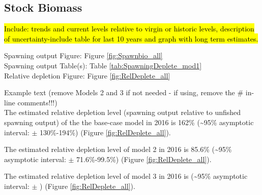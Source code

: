 \documentclass[12pt,]{article}
\begin{document}
\FloatBarrier

\subsection*{Stock Biomass}\label{stock-biomass}

\hl{Include: trends and current levels relative to virgin or historic levels, 
description of uncertainty-include table for last 10 years and graph with 
long term estimates.}

Spawning output Figure: Figure \ref{fig:Spawnbio_all}\\
Spawning output Table(s): Table \ref{tab:SpawningDeplete_mod1}\\
Relative depletion Figure: Figure \ref{fig:RelDeplete_all}

Example text (remove Models 2 and 3 if not needed - if using, remove the
\# in-line comments!!!)\\
The estimated relative depletion level (spawning output relative to
unfished spawning output) of the the base-case model in 2016 is 162\%
(\textasciitilde{}95\% asymptotic interval: \(\pm\) 130\%-194\%) (Figure
\ref{fig:RelDeplete_all}).

The estimated relative depletion level of model 2 in 2016 is 85.6\%
(\textasciitilde{}95\% asymptotic interval: \(\pm\) 71.6\%-99.5\%)
(Figure \ref{fig:RelDeplete_all}).

The estimated relative depletion level of model 3 in 2016 is
(\textasciitilde{}95\% asymptotic interval: \(\pm\) ) (Figure
\ref{fig:RelDeplete_all}).

\FloatBarrier
\end{document}
